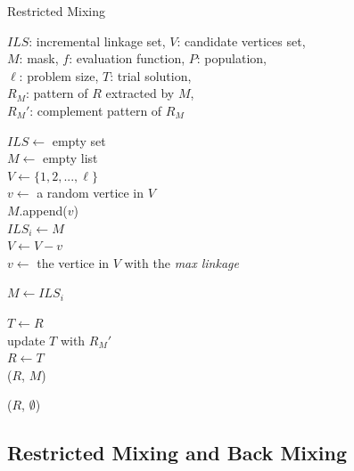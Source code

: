 \documentclass{sig-alternate-05-2015}
\begin{document}
\begin{algorithm}[t!]
\caption{Restricted Mixing}\label{algo_disjdecomp}

$ILS$: incremental linkage set, $V$: candidate vertices set, \\
$M$: mask, $f$: evaluation function, $P$: population, \\
$\ell$: problem size, $T$: trial solution, \\
${R_M}$: pattern of $R$ extracted by $M$, \\
${R_M}'$: complement pattern of ${R_M}$

\BlankLine
{}

\BlankLine
$ILS \leftarrow$ empty set \\
$M \leftarrow$ empty list \\
$V \leftarrow \{ 1, 2, ..., \ell \}$ \\
$v \leftarrow$ a random vertice in $V$ \\


\BlankLine
{}
 {
    $M$.append($v$) \\
    $ILS_{i} \leftarrow M$ \\
    $V \leftarrow V - v$ \\

    $v \leftarrow$ the vertice in $V$ with the {\it max linkage}\\
}

\BlankLine
{}
 {

    $M \leftarrow ILS_{i}$ \\

     {

        $T \leftarrow R$ \\
        update $T$ with ${R_M}'$ \\

         {
            $R \leftarrow T$ \\
            \Return ($R$, $M$)
        }
    }
}
\Return ($R$, $\emptyset$) 
\end{algorithm}


\subsection{Restricted Mixing and Back Mixing}
\end{document}
